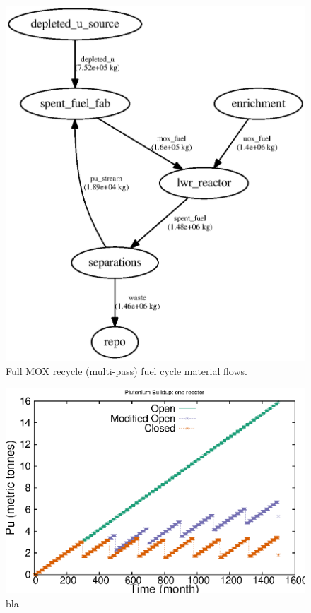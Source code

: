 \begin{figure}[!]
\label{fig:flow-closed}
\caption{Full MOX recycle (multi-pass) fuel cycle material flows.}
\begin{center}
\includegraphics{./images/flow-closed-1.eps}
\end{center}
\end{figure}


\begin{figure}[!]
\label{fig:puseries-1}
\caption{bla}
\begin{center}
\includegraphics{./images/puseries-1.eps}
\end{center}
\end{figure}

